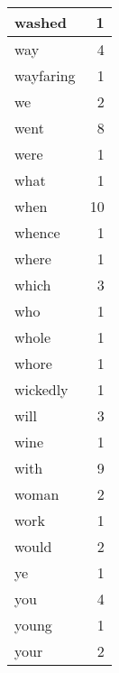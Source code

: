 \begin{center}
\begin{longtable}{l|r}
washed & 1 \\ \hline
way & 4 \\ \hline
wayfaring & 1 \\ \hline
we & 2 \\ \hline
went & 8 \\ \hline
were & 1 \\ \hline
what & 1 \\ \hline
when & 10 \\ \hline
whence & 1 \\ \hline
where & 1 \\ \hline
which & 3 \\ \hline
who & 1 \\ \hline
whole & 1 \\ \hline
whore & 1 \\ \hline
wickedly & 1 \\ \hline
will & 3 \\ \hline
wine & 1 \\ \hline
with & 9 \\ \hline
woman & 2 \\ \hline
work & 1 \\ \hline
would & 2 \\ \hline
ye & 1 \\ \hline
you & 4 \\ \hline
young & 1 \\ \hline
your & 2 \\ \hline
\end{longtable}
\end{center}



\normalsize



